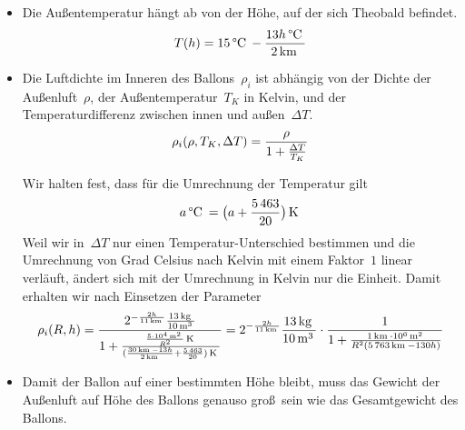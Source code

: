 \documentclass[../full]{subfiles}
\newcommand\Unit[2][]{
    \mskip \thinmuskip \relax \mathrm{#2}^{#1} \mskip \thinmuskip \relax
}
\newcommand\kg{\Unit{kg}}
\newcommand\m[1][]{\Unit[#1]{m}}
\newcommand\km[1][]{\Unit[#1]{km}}
\newcommand\Celsius{\Unit{\degree C}}
\newcommand\Kelvin{\Unit{K}}
\newcommand\ThousandSep{\,}
\begin{document}
\begin{itemize}
        \item
        Die Au\ss entemperatur h\"angt ab von der H\"ohe,
        auf der sich Theobald befindet.
        \begin{equation*}
            T \paren{h} = 15 \Celsius - \frac{13h \Celsius}{2 \km}
        \end{equation*}

        \item
        Die Luftdichte im Inneren des Ballons~\( \rho_i \)
        ist abh\"angig von der Dichte der Au\ss enluft~\( \rho \),
        der Au\ss entemperatur~\( T_K \) in Kelvin,
        und der Temperaturdifferenz zwischen innen und au\ss en~\( \Delta T \).
        \begin{equation*}
            \rho_i \lparen\rho, T_K, \Delta T\rparen
            = \frac{\rho}{1 + \frac{\Delta T}{T_K}}
        \end{equation*}

        Wir halten fest, dass f\"ur die Umrechnung der Temperatur gilt
        \begin{equation*}
            a \Celsius = \paren[\big]{a + \frac{5\ThousandSep 463}{20}} \Kelvin
        \end{equation*}
        Weil wir in~\( \Delta T \) nur einen Temperatur-Unterschied bestimmen
        und die Umrechnung von Grad Celsius nach Kelvin
        mit einem Faktor~\( 1 \) linear verl\"auft,
        \"andert sich mit der Umrechnung in Kelvin nur die Einheit.
        Damit erhalten wir nach Einsetzen der Parameter
        \begin{equation*}
            \rho_i \paren{R, h}
            = \frac
                {2^{-\frac{2h}{11 \km}} \frac{13 \kg}{10 \m[3]}}
                {
                    1 + \frac
                        {\frac{5 \cdot 10^4 \m[2]}{R^2} \Kelvin}
                        {
                            \paren{
                                \frac{30 \km - 13h}{2 \km}
                                + \frac{5\ThousandSep 463}{20}
                            } \Kelvin
                        }
                }
            = 2^{-\frac{2h}{11 \km}} \frac{13 \kg}{10 \m[3]}
                \cdot \frac
                    {1}
                    {
                        1 + \frac
                            {1 \km \cdot 10^6 \m[2]}
                            {R^2 \paren{5\ThousandSep 763 \km - 130h}}
                    }
        \end{equation*}

        \item
        Damit der Ballon auf einer bestimmten H\"ohe bleibt,
        muss das Gewicht der Au\ss enluft auf H\"ohe des Ballons
        genauso gro\ss\ sein wie das Gesamtgewicht des Ballons.
    \end{itemize}
\end{document}
